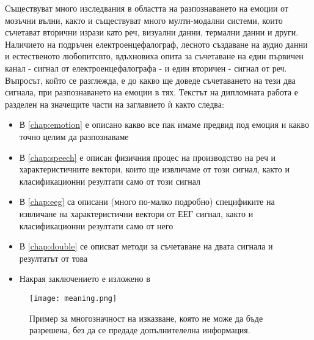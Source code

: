 \documentclass[main.tex]{subfiles}
\begin{document}
Съществуват много изследвания в областта на разпознаването на емоции от мозъчни вълни, както и съществуват много мулти-модални системи, които съчетават вторични изрази като реч, визуални данни, термални данни и други. Наличието на подръчен електроенцефалограф, лесното създаване на аудио данни и естественото любопитсвто, вдъхновиха опита за съчетаване на един първичен канал - сигнал от електроенцефалографа - и един вторичен - сигнал от реч. Въпросът, който се разглежда, е до какво ще доведе съчетаването на тези два сигнала, при разпознаването на емоции в тях. Текстът на дипломната работа е разделен на значещите части на заглавието ѝ както следва:
\begin{itemize}
    \item В \autoref{chap:emotion} е описано какво все пак имаме предвид под емоция и какво точно целим да разпознаваме
    \item В \autoref{chap:speech} е описан физичния процес на производство на реч и характеристичните вектори, които ще извличаме от този сигнал, както и класификационни резултати само от този сигнал
    \item В \autoref{chap:eeg} са описани (много по-малко подробно) спецификите на извличане на характеристични вектори от ЕЕГ сигнал, както и класификационни резултати само от него
    \item В \autoref{chap:double} се описват методи за съчетаване на двата сигнала и резултатът от това
    \item Накрая заключението е изложено в  
\end{itemize}
\begin{center}
    \begin{figure}[ht]%
        \texttt{[image: meaning.png]}%
        \caption{Пример за многозначност на изказване, която не може да бъде разрешена, без да се предаде допълнителелна информация.}%
        \label{fig:intro:1}
    \end{figure}
\end{center}

\let\thefootnote\relax{}
\end{document}
